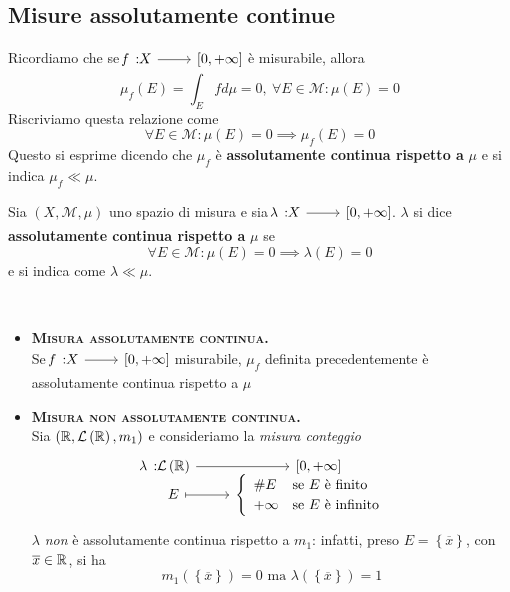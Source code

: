 \subsection{Misure assolutamente continue}
Ricordiamo che se $\funz{f}{X}{\left[0,+\infty\right]}$ è misurabile, allora
\begin{equation*}
		\mu_f\left(E\right)=\int_Efd\mu=0,\ \forall E\in\mathcal{M}\colon \mu\left(E\right)=0
\end{equation*}
Riscriviamo questa relazione come
\begin{equation*}
	\forall E\in\mathcal{M}\colon\mu\left(E\right)=0\implies \mu_f\left(E\right)=0
\end{equation*}
Questo si esprime dicendo che $\mu_f$ è \textbf{assolutamente continua rispetto a} $\mu$ e si indica $\mu_f \ll \mu$.
\begin{define}
	Sia $\left(X,\mathcal{M},\mu\right)$ uno spazio di misura e sia $\funz{\lambda}{X}{\left[0,+\infty\right]}$. $\lambda$ si dice \textbf{assolutamente continua rispetto a }$\mu$ se
	\begin{equation}
		\forall E\in\mathcal{M}\colon \mu\left(E\right)=0\implies \lambda\left(E\right)=0
	\end{equation}
e si indica come $\lambda \ll \mu$.
\end{define}
\begin{examples}~{}
	\begin{itemize}
		\item \textsc{\textbf{Misura assolutamente continua.}}\\
		Se $\funz{f}{X}{\left[0,+\infty\right]}$ misurabile, $\mu_f$ definita precedentemente è assolutamente continua rispetto a $\mu$
		\item \textsc{\textbf{Misura non assolutamente continua.}}\\
		Sia $\left(\mathbb{R},\mathcal{L}\left(\mathbb{R}\right),m_1\right)$ e consideriamo la \textit{misura conteggio}
		\begin{equation*}
			\funztot{\lambda}{\mathcal{L}\left(\realset\right)}{\left[0,+\infty\right]}{E}{\begin{cases}
					\begin{array}{ll}
						\# E&\text{se }E\text{ è finito}\\
						+\infty&\text{se }E\text{ è infinito}
					\end{array}
			\end{cases}}
		\end{equation*}
		$\lambda$ \textit{non} è assolutamente continua rispetto a $m_1$: infatti, preso $E=\left\{\overline{x}\right\}$, con $\overline{x}\in\mathbb{R}$, si ha
		\begin{equation*}
			m_1\left(\left\{\overline{x}\right\}\right)=0\text{ ma }\lambda\left(\left\{\overline{x}\right\}\right)=1
		\end{equation*}
	\end{itemize}
\end{examples}
